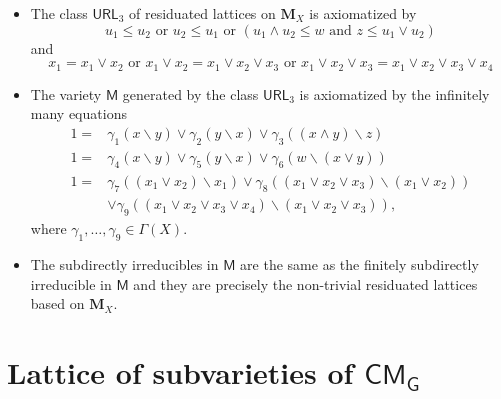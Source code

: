 \documentclass[professionalfont, handout, 10pt]{beamer} %
\theoremstyle{plain}
\theoremstyle{definition}
\begin{document}
\begin{frame}
    \begin{itemize}
        \item The class $\mathsf{URL}_3$ of residuated lattices on $\mathbf{M}_X$ is axiomatized by
        \begin{equation}\tag{URL}\label{axiom_URL}
        u_1 \leq u_2 \text{ or } u_2 \leq u_1 \text{ or } (u_1 \wedge u_2 \leq w \text{ and } z \leq u_1 \vee u_2)
        \end{equation}
        and
        \begin{equation}\tag{$h_3$}\label{axiom_of_finite_height}
            x_1 = x_1 \vee x_2 \text{ or } x_1 \vee x_2 = x_1 \vee x_2 \vee x_3 \text{ or } x_1 \vee x_2 \vee x_3 = x_1 \vee x_2 \vee x_3 \vee x_4
        \end{equation}\pause

        \item The variety $\mathsf{M}$ generated by the class $\mathsf{URL}_3$ is axiomatized by the infinitely many equations
        \begin{align*}
            1 = & \gamma_1(x \backslash y) \vee \gamma_2(y \backslash x) \vee \gamma_3 ((x \wedge y) \backslash z)\\
            1 = & \gamma_4(x \backslash y) \vee \gamma_5(y \backslash x) \vee \gamma_6 (w \backslash (x \vee y))\\
            1 = & \gamma_7((x_1 \vee x_2)\backslash x_1) \vee \gamma_8((x_1 \vee x_2 \vee x_3)\backslash (x_1 \vee x_2))\\
            & \vee \gamma_9((x_1 \vee x_2 \vee x_3 \vee x_4) \backslash (x_1 \vee x_2 \vee x_3)),
        \end{align*}
        where $ \gamma_1, \dots, \gamma_9 \in \Gamma(X)$.\pause

        \item The subdirectly irreducibles in $\mathsf{M}$ are the same as the finitely subdirectly irreducible in $\mathsf{M}$ and they are precisely the non-trivial residuated lattices based on $\mathbf{M}_X$.
    \end{itemize}
\end{frame}

\section{Lattice of subvarieties of $\mathsf{CM_G}$}
\end{document}
